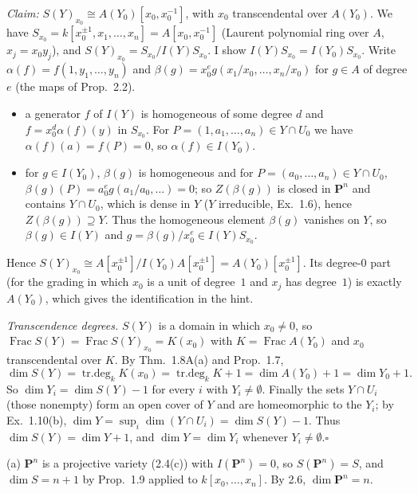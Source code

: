 \documentclass[11pt]{article}
\begin{document}
\emph{Claim:} $S(Y)_{x_0}\cong A(Y_0)[x_0,x_0^{-1}]$, with $x_0$ transcendental over $A(Y_0)$. We have $S_{x_0}=k[x_0^{\pm1},x_1,\dots,x_n]=A[x_0,x_0^{-1}]$ (Laurent polynomial ring over $A$, $x_j=x_0y_j$), and $S(Y)_{x_0}=S_{x_0}/I(Y)S_{x_0}$. I show $I(Y)S_{x_0}=I(Y_0)S_{x_0}$. Write $\alpha(f)=f(1,y_1,\dots,y_n)$ and $\beta(g)=x_0^{e}g(x_1/x_0,\dots,x_n/x_0)$ for $g\in A$ of degree $e$ (the maps of Prop.~2.2).
\begin{itemize}
\item[$\subseteq$:] a generator $f$ of $I(Y)$ is homogeneous of some degree $d$ and $f=x_0^d\alpha(f)(y)$ in $S_{x_0}$. For $P=(1,a_1,\dots,a_n)\in Y\cap U_0$ we have $\alpha(f)(a)=f(P)=0$, so $\alpha(f)\in I(Y_0)$.
\item[$\supseteq$:] for $g\in I(Y_0)$, $\beta(g)$ is homogeneous and for $P=(a_0,\dots,a_n)\in Y\cap U_0$, $\beta(g)(P)=a_0^eg(a_1/a_0,\dots)=0$; so $Z(\beta(g))$ is closed in $\mathbf P^n$ and contains $Y\cap U_0$, which is dense in $Y$ ($Y$ irreducible, Ex.~1.6), hence $Z(\beta(g))\supseteq Y$. Thus the homogeneous element $\beta(g)$ vanishes on $Y$, so $\beta(g)\in I(Y)$ and $g=\beta(g)/x_0^e\in I(Y)S_{x_0}$.
\end{itemize}
Hence $S(Y)_{x_0}\cong A[x_0^{\pm1}]/I(Y_0)A[x_0^{\pm1}]=A(Y_0)[x_0^{\pm1}]$. Its degree-$0$ part (for the grading in which $x_0$ is a unit of degree~$1$ and $x_j$ has degree~$1$) is exactly $A(Y_0)$, which gives the identification in the hint.

\emph{Transcendence degrees.} $S(Y)$ is a domain in which $x_0\ne0$, so $\operatorname{Frac}S(Y)=\operatorname{Frac}S(Y)_{x_0}=K(x_0)$ with $K=\operatorname{Frac}A(Y_0)$ and $x_0$ transcendental over $K$. By Thm.~1.8A(a) and Prop.~1.7,
\[
\dim S(Y)=\operatorname{tr.deg}_k K(x_0)=\operatorname{tr.deg}_kK+1=\dim A(Y_0)+1=\dim Y_0+1 .
\]
So $\dim Y_i=\dim S(Y)-1$ for every $i$ with $Y_i\ne\emptyset$. Finally the sets $Y\cap U_i$ (those nonempty) form an open cover of $Y$ and are homeomorphic to the $Y_i$; by Ex.~1.10(b), $\dim Y=\sup_i\dim(Y\cap U_i)=\dim S(Y)-1$. Thus $\dim S(Y)=\dim Y+1$, and $\dim Y=\dim Y_i$ whenever $Y_i\ne\emptyset$.\hfill$\square$

\pf
(a) $\mathbf P^n$ is a projective variety (2.4(c)) with $I(\mathbf P^n)=0$, so $S(\mathbf P^n)=S$, and $\dim S=n+1$ by Prop.~1.9 applied to $k[x_0,\dots,x_n]$. By 2.6, $\dim\mathbf P^n=n$.
\end{document}
